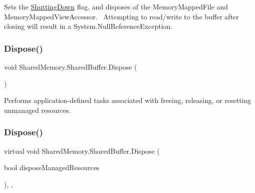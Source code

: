 Sets the \hyperlink{class_shared_memory_1_1_shared_buffer_a598ee38e06ba63929f51946963694b72}{Shutting\+Down} flag, and disposes of the Memory\+Mapped\+File and Memory\+Mapped\+View\+Accessor.~\newline
 Attempting to read/write to the buffer after closing will result in a System.\+Null\+Reference\+Exception. 

\mbox{\label{class_shared_memory_1_1_shared_buffer_ab6e7d8bec7cdce8c450ff697c151ea36}} 
\subsubsection{\texorpdfstring{Dispose()}{Dispose()}\hspace{0.1cm}{\footnotesize\ttfamily [1/2]}}
{\footnotesize\ttfamily void Shared\+Memory.\+Shared\+Buffer.\+Dispose (\begin{DoxyParamCaption}{ }\end{DoxyParamCaption})\hspace{0.3cm}{\ttfamily [inline]}}



Performs application-\/defined tasks associated with freeing, releasing, or resetting unmanaged resources. 

\mbox{\label{class_shared_memory_1_1_shared_buffer_aa3db897346aa2c22a9d0d6b05ff7c058}} 
\subsubsection{\texorpdfstring{Dispose()}{Dispose()}\hspace{0.1cm}{\footnotesize\ttfamily [2/2]}}
{\footnotesize\ttfamily virtual void Shared\+Memory.\+Shared\+Buffer.\+Dispose (\begin{DoxyParamCaption}\item[{bool}]{dispose\+Managed\+Resources }\end{DoxyParamCaption})\hspace{0.3cm}{\ttfamily [inline]}, {\ttfamily [protected]}, {\ttfamily [virtual]}}



